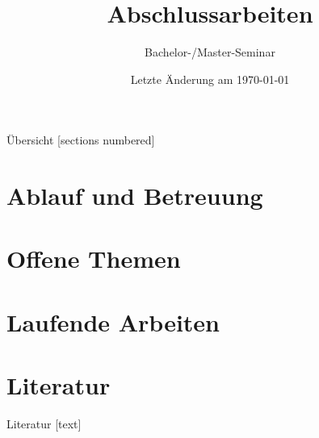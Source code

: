 \documentclass[aspectratio=169]{beamer}
\title[Abschlussarbeiten]{Abschlussarbeiten}
\subtitle[]{Bachelor-/Master-Seminar}
\author{}
\institute{}
\date{
	{\vfill \tiny Letzte Änderung am \today}
}
\begin{document}
\frame{
	\maketitle
}


\begin{frame}{Übersicht}
  [sections numbered]
  \tableofcontents%
\end{frame}

\section{Ablauf und Betreuung}


\section{Offene Themen}


\section{Laufende Arbeiten}


\section{Literatur}
\begin{frame}[allowframebreaks]{Literatur}
	[text]
	
		
\end{frame}
\end{document}
